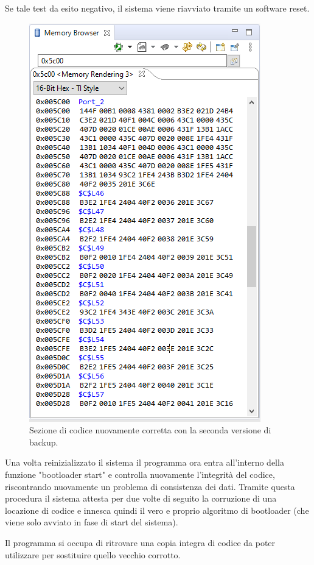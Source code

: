\documentclass[LaM,binding=0.6cm,oneside]{../sapthesis}
\begin{document}
Se tale test da esito negativo, il sistema viene riavviato tramite un software reset.


\begin{figure}[htbp]
\centerline{\includegraphics[scale=0.55]{examples/BootloaderTestCorruzioni3.PNG}}
\caption{Sezione di codice nuovamente corretta con la seconda versione di backup.}
\label{fig}
\end{figure}
\newline

Una volta reinizializzato il sistema il programma ora entra all'interno della funzione "bootloader start" e controlla nuovamente l'integrità del codice, riscontrando nuovamente un problema di consistenza dei dati. Tramite questa procedura il sistema attesta per due volte di seguito la corruzione di una locazione di codice e innesca quindi il vero e proprio algoritmo di bootloader (che viene solo avviato in fase di start del sistema). 

Il programma si occupa di ritrovare una copia integra di codice da poter utilizzare per sostituire quello vecchio corrotto.
\end{document}
